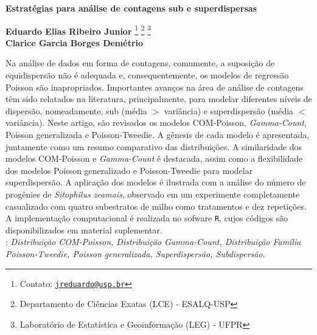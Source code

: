 \documentclass[12pt, a4paper]{article}
\begin{document}
\onehalfspacing

\begin{center}
  \textbf{
    \Large{Estratégias para análise de contagens sub e
      superdispersas}} \\[1em]
\end{center}

\begin{flushright}
  {\bf Eduardo Elias Ribeiro Junior}
  \footnote[$\dagger$]{Contato:
    \href{mailto:jreduardo@usp.br}{\tt jreduardo@usp.br}}
  \footnote[1]{Departamento de Ciências Exatas (LCE) - ESALQ-USP}
  \footnote[2]{Laboratório de Estatística e Geoinformação (LEG) -
    UFPR}\\
  {\bf Clarice Garcia Borges Demétrio} \footnotemark[1]
\end{flushright}

\vspace*{0.5cm}

\noindent Na análise de dados em forma de contagens, comumente, a
suposição de equidispersão não é adequada e, consequentemente, os
modelos de regressão Poisson são inapropriados. Importantes avanços na
área de análise de contagens têm sido relatados na literatura,
principalmente, para modelar diferentes níveis de dispersão,
nomeadamente, sub (média $>$ variância) e superdispersão (média $<$
variância). Neste artigo, são revisados os modelos COM-Poisson,
\textit{Gamma-Count}, Poisson generalizada e Poisson-Tweedie. A gênesis
de cada modelo é apresentada, juntamente como um resumo comparativo das
distribuições. A similaridade dos modelos COM-Poisson e
\textit{Gamma-Count} é destacada, assim como a flexibilidade dos modelos
Poisson generalizado e Poisson-Tweedie para modelar superdispersão. A
aplicação dos modelos é ilustrada com a análise do número de progênies
de \textit{Sitophilus zeamais}, observado em um experimente completamente
casualizado com quatro subestratos de milho como tratamentos e dez
repetições. A implementação computacional é realizada no sofware
\texttt{R}, cujos códigos são disponibilizados em material
suplementar.\\

:
{\it Distribuição COM-Poisson, Distribuição Gamma-Count, Distribuição
  Família Poisson-Tweedie, Poisson generalizada, Superdispersão,
  Subdispersão}.\\
\end{document}
